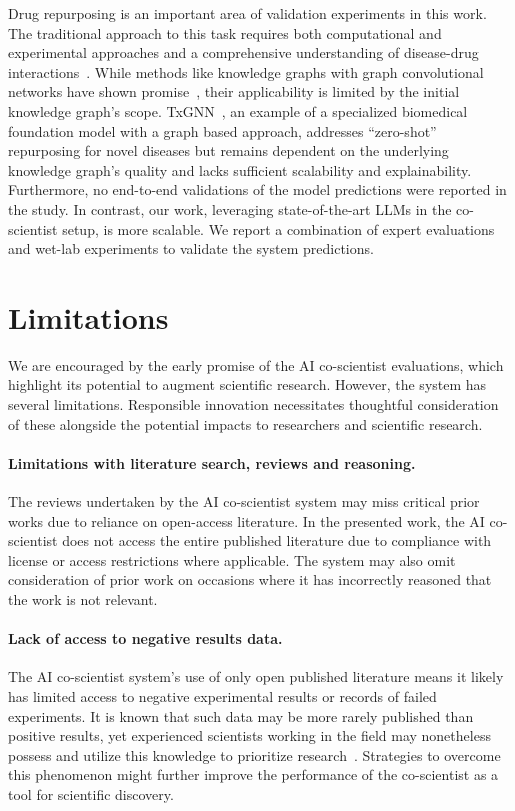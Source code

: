 Drug repurposing is an important area of validation experiments in this work. The traditional approach to this task requires both computational and experimental approaches and a comprehensive understanding of disease-drug interactions~\cite{pushpakom2019drug, krishnamurthy2022drug}. While methods like knowledge graphs with graph convolutional networks have shown promise~\cite{zitnik2018modeling, morselli2021network}, their applicability is limited by the initial knowledge graph's scope.  TxGNN~\cite{huang2024foundation}, an example of a specialized biomedical foundation model with a graph based approach, addresses ``zero-shot'' repurposing for novel diseases but remains dependent on the underlying knowledge graph's quality and lacks sufficient scalability and explainability. Furthermore, no end-to-end validations of the model predictions were reported in the study. In contrast, our work, leveraging state-of-the-art LLMs in the co-scientist setup, is more scalable. We report a combination of expert evaluations and wet-lab experiments to validate the system predictions.



\clearpage


\section{Limitations}
\label{sec:limitations}
We are encouraged by the early promise of the AI co-scientist evaluations, which highlight its potential to augment scientific research.
However, the system has several limitations. Responsible innovation necessitates thoughtful consideration of these alongside the potential impacts to researchers and scientific research. 

\paragraph{Limitations with literature search, reviews and reasoning.} The reviews undertaken by the AI co-scientist system may miss critical prior works due to reliance on open-access literature. In the presented work, the AI co-scientist does not access the entire published literature due to compliance with license or access restrictions where applicable. The system may also omit consideration of prior work on occasions where it has incorrectly reasoned that the work is not relevant.

\paragraph{Lack of access to negative results data.} The AI co-scientist system's use of only open published literature means it likely has limited access to negative experimental results or records of failed experiments. It is known that such data may be more rarely published than positive results, yet experienced scientists working in the field may nonetheless possess and utilize this knowledge to prioritize research~\citep{brazil2024illuminating}. Strategies to overcome this phenomenon might further improve the performance of the co-scientist as a tool for scientific discovery.

